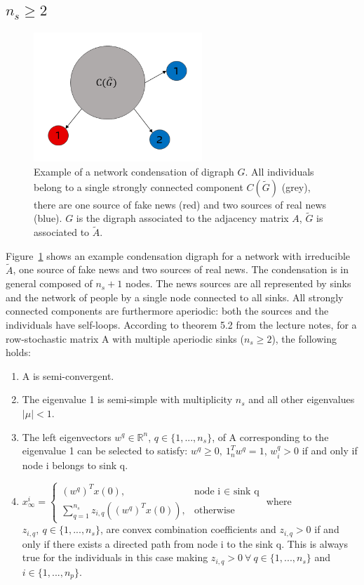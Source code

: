 \subsection{$n_s \geq 2$}
\begin{figure}[!t]
	\centering
	\includegraphics[width=2.5in]{Figures/condensation_digraph.png}
	\caption{Example of a network condensation of digraph $G$. All individuals belong to a single strongly connected component $C(\tilde{G})$ (grey), there are one source of fake news (red) and two sources of real news (blue). $G$ is the digraph associated to the adjacency matrix $A$, $\tilde{G}$ is associated to $\tilde{A}$.}
	\label{pics:condensation_digraph_example}
\end{figure}
Figure~\ref{pics:condensation_digraph_example} shows an example condensation digraph for a network with irreducible $\tilde{A}$, one source of fake news and two sources of real news. The condensation is in general composed of $n_s+1$ nodes.  The news sources are all represented by sinks and the network of people by a single node connected to all sinks. \newline
All strongly connected components are furthermore aperiodic: both the sources and the individuals have self-loops.
According to theorem 5.2 from the lecture notes, for a row-stochastic matrix A with multiple aperiodic sinks ($n_s \geq 2$), the following holds:
\begin{enumerate}
	\item
	A is semi-convergent.
	\item
	The eigenvalue 1 is semi-simple with multiplicity $n_s$ and all other eigenvalues $|\mu|<1$.
	\item
	The left eigenvectors $w^q \in \mathbb{R}^n$, $q\in \{1,...,n_s\}$, of A corresponding to the eigenvalue 1 can be selected to satisfy: $w^q\geq0,\ 1_n^Tw^q=1$, $w^q_i>0$ if and only if node i belongs to sink q.
	\item
	$
	x_{\infty}^i = 
	\begin{cases}
	(w^q)^Tx(0),& \text{node i $\in$ sink q}\\
	\sum_{q=1}^{n_s} z_{i,q}((w^q)^Tx(0)), & \text{otherwise}
	\end{cases}
	$
	where $z_{i,q},\ q\in\{1,...,n_s\}$, are convex combination coefficients and $z_{i,q} > 0$ if and only if there exists a directed path from node i to the sink q. This is always true for the individuals in this case making $z_{i,q} > 0\ \forall\ q \in \{1,...,n_s\}$ and $i \in \{1,...,n_p\}$.
\end{enumerate}
